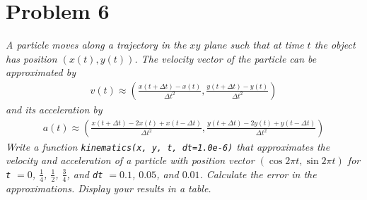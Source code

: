 \documentclass[12pt]{article}
\begin{document}
\pagebreak
\section*{Problem 6}
{\it A particle moves along a trajectory in the $xy$ plane such that at time $t$ the object has position $(x(t), y(t))$.  The velocity vector of the particle can be approximated by}
\begin{align*}
    v(t) \approx \left(\frac{x(t + \Delta t) - x(t)}{\Delta t^2}, \frac{y(t + \Delta t) - y(t)}{\Delta t^2}\right)
\end{align*}
{\it and its acceleration by}
\begin{align*}
    a(t) \approx \left(\frac{x(t + \Delta t) - 2x(t) + x(t - \Delta t)}{\Delta t^2}, \frac{y(t + \Delta t) - 2y(t) + y(t - \Delta t)}{\Delta t^2}\right)
\end{align*}
{\it Write a function {\tt kinematics(x, y, t, dt=1.0e-6)} that approximates the velocity and acceleration of a particle with position vector $(\cos{2\pi t}, \sin{2\pi t})$ for {\tt t} $ = 0$, $\frac{1}{4}$, $\frac{1}{2}$, $\frac{3}{4}$, and {\tt dt} $ = 0.1$, $0.05$, and $0.01$.  Calculate the error in the approximations.  Display your results in a table.} \\
\end{document}
